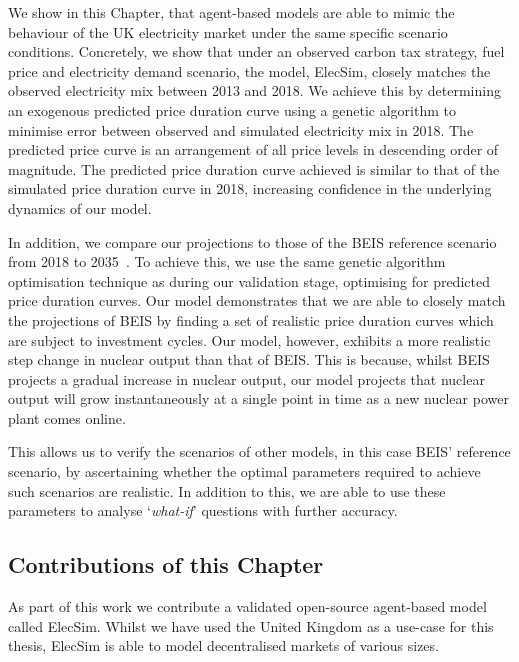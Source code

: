
We show in this Chapter, that agent-based models are able to mimic the behaviour of the UK electricity market under the same specific scenario conditions. Concretely, we show that under an observed carbon tax strategy, fuel price and electricity demand scenario, the model, ElecSim, closely matches the observed electricity mix between 2013 and 2018. We achieve this by determining an exogenous predicted price duration curve using a genetic algorithm to minimise error between observed and simulated electricity mix in 2018. The predicted price curve is an arrangement of all price levels in descending order of magnitude. The predicted price duration curve achieved is similar to that of the simulated price duration curve in 2018, increasing confidence in the underlying dynamics of our model. 

In addition, we compare our projections to those of the BEIS reference scenario from 2018 to 2035~\cite{DBEIS2019}. To achieve this, we use the same genetic algorithm optimisation technique as during our validation stage, optimising for predicted price duration curves. Our model demonstrates that we are able to closely match the projections of BEIS by finding a set of realistic price duration curves which are subject to investment cycles. Our model, however, exhibits a more realistic step change in nuclear output than that of BEIS. This is because, whilst BEIS projects a gradual increase in nuclear output, our model projects that nuclear output will grow instantaneously at a single point in time as a new nuclear power plant comes online. 

This allows us to verify the scenarios of other models, in this case BEIS' reference scenario, by ascertaining whether the optimal parameters required to achieve such scenarios are realistic. In addition to this, we are able to use these parameters to analyse `\textit{what-if}' questions with further accuracy.


\subsection{Contributions of this Chapter}

As part of this work we contribute a validated open-source agent-based model called ElecSim. Whilst we have used the United Kingdom as a use-case for this thesis, ElecSim is able to model decentralised markets of various sizes. 

